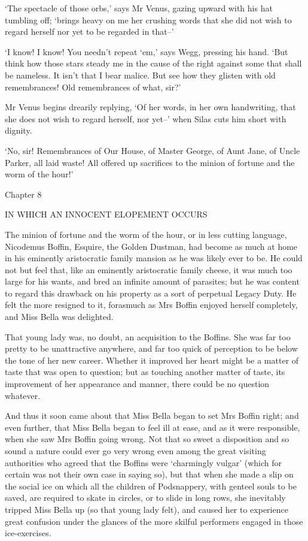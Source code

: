 ‘The spectacle of those orbs,’ says Mr Venus, gazing upward with his hat
tumbling off; ‘brings heavy on me her crushing words that she did not
wish to regard herself nor yet to be regarded in that--’

‘I know! I know! You needn’t repeat ‘em,’ says Wegg, pressing his hand.
‘But think how those stars steady me in the cause of the right against
some that shall be nameless. It isn’t that I bear malice. But see how
they glisten with old remembrances! Old remembrances of what, sir?’

Mr Venus begins drearily replying, ‘Of her words, in her own
handwriting, that she does not wish to regard herself, nor yet--’ when
Silas cuts him short with dignity.

‘No, sir! Remembrances of Our House, of Master George, of Aunt Jane, of
Uncle Parker, all laid waste! All offered up sacrifices to the minion of
fortune and the worm of the hour!’



Chapter 8

IN WHICH AN INNOCENT ELOPEMENT OCCURS


The minion of fortune and the worm of the hour, or in less cutting
language, Nicodemus Boffin, Esquire, the Golden Dustman, had become
as much at home in his eminently aristocratic family mansion as he
was likely ever to be. He could not but feel that, like an eminently
aristocratic family cheese, it was much too large for his wants, and
bred an infinite amount of parasites; but he was content to regard this
drawback on his property as a sort of perpetual Legacy Duty. He felt the
more resigned to it, forasmuch as Mrs Boffin enjoyed herself completely,
and Miss Bella was delighted.

That young lady was, no doubt, an acquisition to the Boffins. She
was far too pretty to be unattractive anywhere, and far too quick of
perception to be below the tone of her new career. Whether it improved
her heart might be a matter of taste that was open to question; but as
touching another matter of taste, its improvement of her appearance and
manner, there could be no question whatever.

And thus it soon came about that Miss Bella began to set Mrs Boffin
right; and even further, that Miss Bella began to feel ill at ease, and
as it were responsible, when she saw Mrs Boffin going wrong. Not that so
sweet a disposition and so sound a nature could ever go very wrong even
among the great visiting authorities who agreed that the Boffins were
‘charmingly vulgar’ (which for certain was not their own case in saying
so), but that when she made a slip on the social ice on which all the
children of Podsnappery, with genteel souls to be saved, are required to
skate in circles, or to slide in long rows, she inevitably tripped Miss
Bella up (so that young lady felt), and caused her to experience great
confusion under the glances of the more skilful performers engaged in
those ice-exercises.

